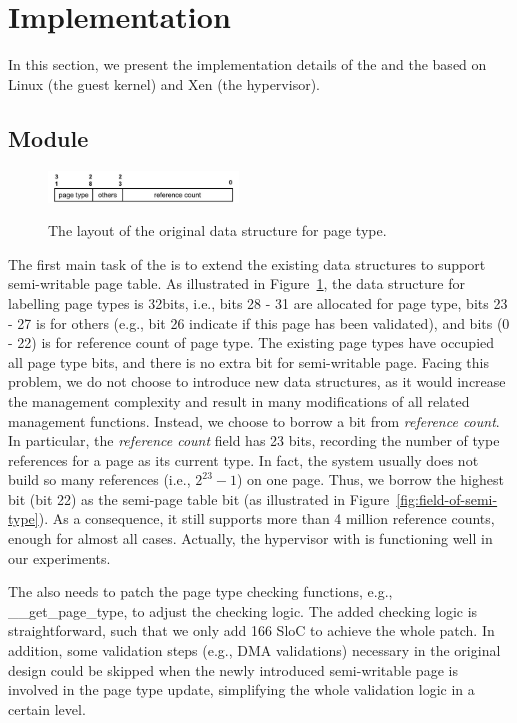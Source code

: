 \section{Implementation} \label{sec:impl}
In this section, we present the implementation details of the \module and the \cache based on Linux (the guest kernel) and Xen (the hypervisor).

\subsection{\name Module}
\begin{figure}[ht]
\centering
\includegraphics[width=0.45\textwidth]{image/implementation/field-of-page-type-info.jpg} \\
\caption{The layout of the original data structure for page type.}
\label{fig:field-of-page-type-info}
\end{figure}
The first main task of the \module is to extend the existing data structures to support semi-writable page table.
As illustrated in Figure~\ref{fig:field-of-page-type-info}, the data structure for labelling page types is 32bits, i.e., bits 28 - 31 are allocated for page type, bits 23 - 27 is for others (e.g., bit 26 indicate if this page has been validated), and bits (0 - 22) is for reference count of page type.
The existing page types have occupied all page type bits, and there is no extra bit for semi-writable page.
Facing this problem, we do not choose to introduce new data structures, as it would increase the management complexity and result in many modifications of all related management functions.
Instead, we choose to borrow a bit from \emph{reference count}.
In particular, the \emph{reference count} field has 23 bits, recording the number of type references for a page as its current type.
In fact, the system usually does not build so many references (i.e., $2^{23}-1$) on one page. Thus, we borrow the highest bit (bit 22) as the semi-page table bit (as illustrated in Figure~\ref{fig:field-of-semi-type}).
As a consequence, it still supports more than 4 million reference counts, enough for almost all cases.
Actually, the hypervisor with \name is functioning well in our experiments.

The \module also needs to patch the page type checking functions, e.g., \_\_get\_page\_type, to adjust the checking logic.
The added checking logic is straightforward, such that we only add 166 SloC to achieve the whole patch.
In addition, some validation steps (e.g., DMA validations) necessary in the original design could be skipped when the newly introduced semi-writable page is involved in the page type update, simplifying the whole validation logic in a certain level.

